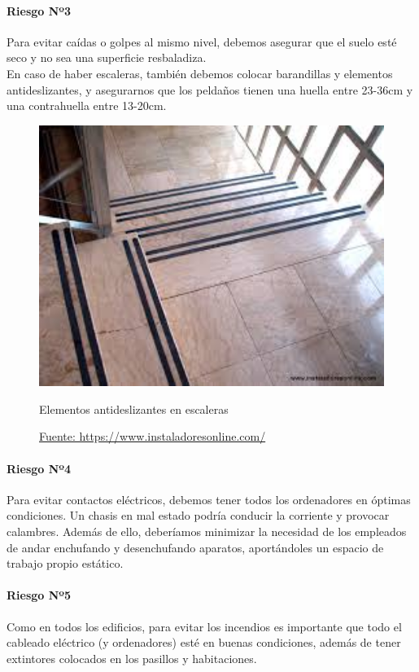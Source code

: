 \paragraph*{Riesgo Nº3}
Para evitar caídas o golpes al mismo nivel, debemos asegurar que el suelo esté seco y
no sea una superficie resbaladiza. \\
En caso de haber escaleras, también debemos colocar barandillas y elementos antideslizantes, y asegurarnos que los peldaños tienen una
huella entre 23-36cm y una contrahuella entre 13-20cm.
\begin{figure}[H]
    \centering
    \includegraphics[width=1.0\textwidth]{Fol/elemAntides.jpg}
    \caption{Elementos antideslizantes en escaleras}
    \caption*{\href{http://www.instaladoresonline.com/cintas_antideslizantes_safety_walk.html}{Fuente: https://www.instaladoresonline.com/}}
\end{figure}
\paragraph*{Riesgo Nº4}
Para evitar contactos eléctricos, debemos tener todos los ordenadores en óptimas
condiciones. Un chasis en mal estado podría conducir la corriente y provocar
calambres. Además de ello, deberíamos minimizar la necesidad de los empleados de
andar enchufando y desenchufando aparatos, aportándoles un espacio de trabajo
propio estático.
\paragraph*{Riesgo Nº5}
Como en todos los edificios, para evitar los incendios es importante que todo el
cableado eléctrico (y ordenadores) esté en buenas condiciones, además de tener
extintores colocados en los pasillos y habitaciones.

